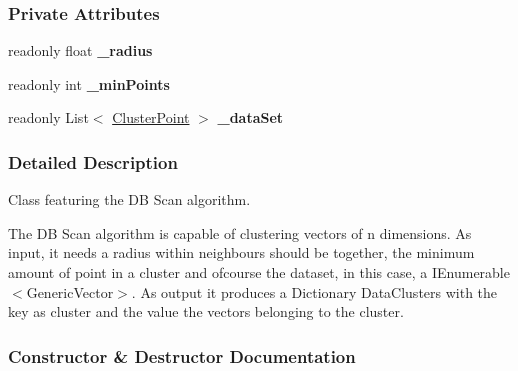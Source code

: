 \subsubsection*{Private Attributes}
\begin{DoxyCompactItemize}
\item 
\mbox{\label{classDataTools_1_1clustering_1_1Dbscan_af53ae97c2a19a2bb966ee64cbc264b7e}} 
readonly float {\bfseries \+\_\+radius}
\item 
\mbox{\label{classDataTools_1_1clustering_1_1Dbscan_a743816aa32698924929ea158a1a40c0f}} 
readonly int {\bfseries \+\_\+min\+Points}
\item 
\mbox{\label{classDataTools_1_1clustering_1_1Dbscan_a91e409ed78afae05248478bc0fb5445b}} 
readonly List$<$ \hyperlink{classDataTools_1_1clustering_1_1ClusterPoint}{Cluster\+Point} $>$ {\bfseries \+\_\+data\+Set}
\end{DoxyCompactItemize}


\subsubsection{Detailed Description}
Class featuring the DB Scan algorithm. 

The DB Scan algorithm is capable of clustering vectors of {\ttfamily n} dimensions. As input, it needs a radius within neighbours should be together, the minimum amount of point in a cluster and ofcourse the dataset, in this case, a {\ttfamily I\+Enumerable$<$\+Generic\+Vector$>$}. As output it produces a Dictionary Data\+Clusters with the key as cluster and the value the vectors belonging to the cluster. 

\subsubsection{Constructor \& Destructor Documentation}
\mbox{\label{classDataTools_1_1clustering_1_1Dbscan_ac54fa4e699ed60d33e90b0deab9f4006_ac54fa4e699ed60d33e90b0deab9f4006}} 
